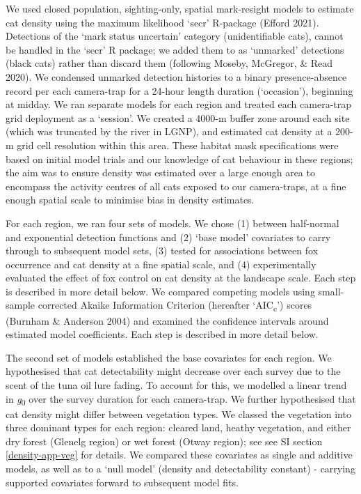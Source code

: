 \documentclass[]{elsarticle} %
\begin{document}
We used closed population, sighting-only, spatial mark-resight models to estimate cat density using the maximum likelihood `secr' R-package (Efford 2021). Detections of the `mark status uncertain' category (unidentifiable cats), cannot be handled in the `secr' R package; we added them to as `unmarked' detections (black cats) rather than discard them (following Moseby, McGregor, \& Read 2020). We condensed unmarked detection histories to a binary presence-absence record per each camera-trap for a 24-hour length duration (`occasion'), beginning at midday. We ran separate models for each region and treated each camera-trap grid deployment as a `session'. We created a 4000-m buffer zone around each site (which was truncated by the river in LGNP), and estimated cat density at a 200-m grid cell resolution within this area. These habitat mask specifications were based on initial model trials and our knowledge of cat behaviour in these regions; the aim was to ensure density was estimated over a large enough area to encompass the activity centres of all cats exposed to our camera-traps, at a fine enough spatial scale to minimise bias in density estimates.

For each region, we ran four sets of models. We chose (1) between half-normal and exponential detection functions and (2) `base model' covariates to carry through to subsequent model sets, (3) tested for associations between fox occurrence and cat density at a fine spatial scale, and (4) experimentally evaluated the effect of fox control on cat density at the landscape scale. Each step is described in more detail below. We compared competing models using small-sample corrected Akaike Information Criterion (hereafter `AIC\textsubscript{c}') scores (Burnham \& Anderson 2004) and examined the confidence intervals around estimated model coefficients. Each step is described in more detail below.

The second set of models established the base covariates for each region. We hypothesised that cat detectability might decrease over each survey due to the scent of the tuna oil lure fading. To account for this, we modelled a linear trend in \emph{g}\textsubscript{0} over the survey duration for each camera-trap. We further hypothesised that cat density might differ between vegetation types. We classed the vegetation into three dominant types for each region: cleared land, heathy vegetation, and either dry forest (Glenelg region) or wet forest (Otway region); see see SI section \ref{density-app-veg} for details. We compared these covariates as single and additive models, as well as to a `null model' (density and detectability constant) - carrying supported covariates forward to subsequent model fits.
\end{document}
